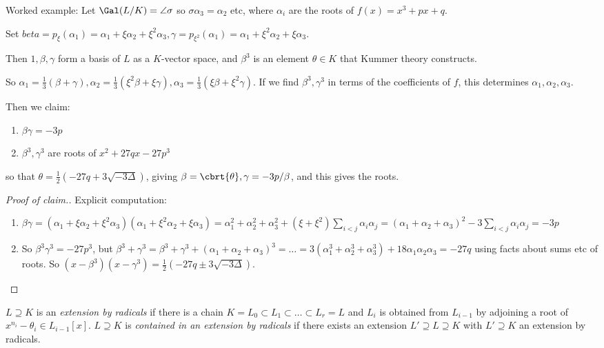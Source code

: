 \documentclass[a4paper, 10pt, twocolumn]{amsart}
\begin{document}
Worked example: Let $\Gal(L/K) = \angle{\sigma}$ so $\sigma \alpha_3 = \alpha_2$ etc, where $\alpha_i$ are the roots of $f(x) = x^3+px+q$.

Set $beta = p_\xi(\alpha_1) = \alpha_1 + \xi \alpha_2 + \xi^2 \alpha_3, \gamma = p_{\xi^2}(\alpha_1) = \alpha_1 + \xi^2 \alpha_2 + \xi \alpha_3$.

Then $1, \beta, \gamma$ form a basis of $L$ as a $K$-vector space, and $\beta^3$ is an element $\theta \in K$ that Kummer theory constructs.

So $\alpha_1 = \frac{1}{3}(\beta+\gamma), \alpha_2 = \frac{1}{3}(\xi^2\beta + \xi\gamma), \alpha_3 = \frac{1}{3}(\xi\beta + \xi^2\gamma)$. If we find $\beta^3, \gamma^3$ in terms of the coefficients of $f$, this determines $\alpha_1, \alpha_2, \alpha_3$.

Then we claim:
\begin{enumerate}
\item $\beta \gamma = -3p$
\item $\beta^3, \gamma^3$ are roots of $x^2+27qx-27p^3$
\end{enumerate}
so that $\theta = \frac{1}{2}(-27q+3\sqrt{-3\Delta})$, giving $\beta = \cbrt{\theta}, \gamma = -3p/\beta$, and this gives the roots.

\begin{proof}[Proof of claim.]
Explicit computation:
\begin{enumerate}
\item $\beta\gamma = (\alpha_1 + \xi \alpha_2+ \xi^2\alpha_3)(\alpha_1+\xi^2\alpha_2+\xi\alpha_3) = \alpha_1^2 + \alpha_2^2 + \alpha_3^2 + (\xi+\xi^2)\sum_{i<j}\alpha_i\alpha_j = (\alpha_1+\alpha_2+\alpha_3)^2 - 3\sum_{i<j} \alpha_i\alpha_j = -3p$

\item So $\beta^3\gamma^3 = -27p^3$, but $\beta^3+\gamma^3 = \beta^3+\gamma^3 + (\alpha_1+\alpha_2+\alpha_3)^3 = \ldots = 3(\alpha_1^3+\alpha_2^3+\alpha_3^3) + 18\alpha_1\alpha_2\alpha_3 = -27q$ using facts about sums etc of roots. So $(x-\beta^3)(x-\gamma^3) = \frac{1}{2}(-27q \pm 3\sqrt{-3\Delta})$.
\end{enumerate}
\end{proof}

$L\supseteq K$ is an \emph{extension by radicals} if there is a chain $K = L_0 \subset L_1 \subset \ldots \subset L_r = L$ and $L_i$ is obtained from $L_{i-1}$ by adjoining a root of $x^{n_i} - \theta_i \in L_{i-1}[x]$. $L \supseteq K$ is \emph{contained in an extension by radicals} if there exists an extension $L' \supseteq L \supseteq K$ with $L'\supseteq K$ an extension by radicals.
\end{document}
